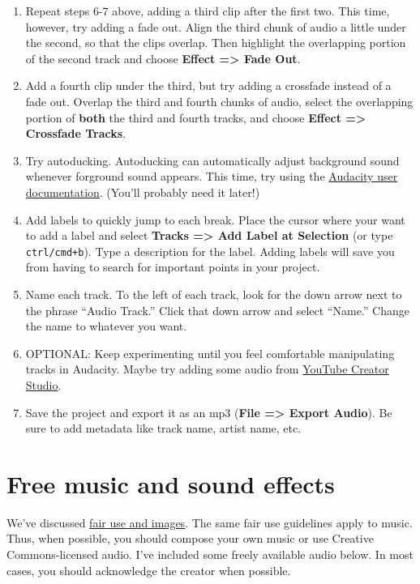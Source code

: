 \documentclass[]{book}
\providecommand{\tightlist}{%
  \setlength{\itemsep}{0pt}\setlength{\parskip}{0pt}}
\theoremstyle{definition}
\theoremstyle{definition}
\theoremstyle{definition}
\theoremstyle{remark}
\begin{document}
\begin{enumerate}
\def\labelenumi{\arabic{enumi}.}
\tightlist
\item
  Repeat steps 6-7 above, adding a third clip after the first two. This
  time, however, try adding a fade out. Align the third chunk of audio a
  little under the second, so that the clips overlap. Then highlight the
  overlapping portion of the second track and choose \textbf{Effect
  =\textgreater{} Fade Out}.
\item
  Add a fourth clip under the third, but try adding a crossfade instead
  of a fade out. Overlap the third and fourth chunks of audio, select
  the overlapping portion of \textbf{both} the third and fourth tracks,
  and choose \textbf{Effect =\textgreater{} Crossfade Tracks}.
\item
  Try autoducking. Autoducking can automatically adjust background sound
  whenever forground sound appears. This time, try using the
  \href{http://manual.audacityteam.org/man/auto_duck.html}{Audacity user
  documentation}. (You'll probably need it later!)
\item
  Add labels to quickly jump to each break. Place the cursor where your
  want to add a label and select \textbf{Tracks =\textgreater{} Add
  Label at Selection} (or type \texttt{ctrl/cmd+b}). Type a description
  for the label. Adding labels will save you from having to search for
  important points in your project.
\item
  Name each track. To the left of each track, look for the down arrow
  next to the phrase ``Audio Track.'' Click that down arrow and select
  ``Name.'' Change the name to whatever you want.
\item
  OPTIONAL: Keep experimenting until you feel comfortable manipulating
  tracks in Audacity. Maybe try adding some audio from
  \href{https://www.youtube.com/dashboard?o=U}{YouTube Creator Studio}.
\item
  Save the project and export it as an mp3 (\textbf{File =\textgreater{}
  Export Audio}). Be sure to add metadata like track name, artist name,
  etc.
\end{enumerate}

\hypertarget{free-music-and-sound-effects}{%
\section{Free music and sound
effects}\label{free-music-and-sound-effects}}

We've discussed \protect\hyperlink{medium}{fair use and images}. The
same fair use guidelines apply to music. Thus, when possible, you should
compose your own music or use Creative Commons-licensed audio. I've
included some freely available audio below. In most cases, you should
acknowledge the creator when possible.
\end{document}
